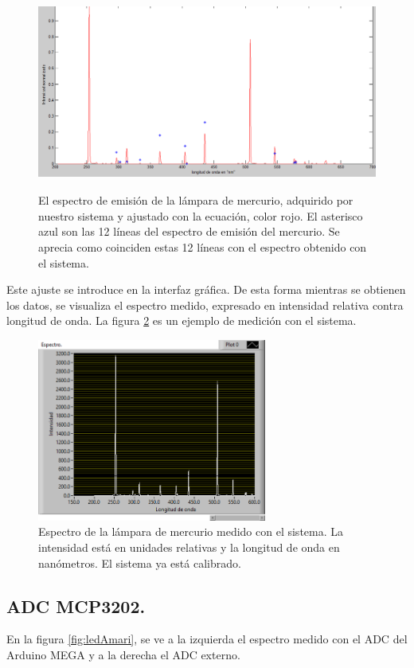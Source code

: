 \begin{figure}[h]
	\centering
	\includegraphics[width=1\linewidth,height=6.5cm]{Imagenes/3/compararLP}
	\caption{El espectro de emisión de la lámpara de mercurio, adquirido por nuestro sistema y ajustado con la ecuación, color rojo. El asterisco azul son las 12 líneas del espectro de emisión del mercurio. Se aprecia como coinciden estas 12 líneas con el espectro obtenido con el sistema.}
	\label{fig:compararlp}
\end{figure}
Este ajuste se introduce en la interfaz gráfica. De esta forma mientras se obtienen los datos, se visualiza el espectro medido, expresado en intensidad relativa contra longitud de onda. La figura \ref{fig:labviewmedir} es un ejemplo de medición con el sistema.\\
\begin{figure}[h]
	\centering
	\includegraphics[width=0.9 \linewidth, height=6cm]{Imagenes/3/LabViewMedir}
	\caption{Espectro de la lámpara de mercurio medido con el sistema. La intensidad está en unidades relativas y la longitud de onda en nanómetros. El sistema ya está calibrado.}
	\label{fig:labviewmedir}
\end{figure}

\subsection{ADC MCP3202.}
En la figura \ref{fig:ledAmari}, se ve a la izquierda el espectro medido con el ADC del Arduino MEGA y a la derecha el ADC externo. 

